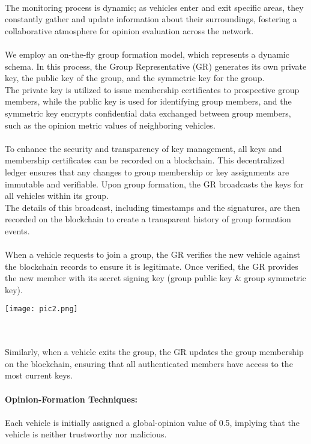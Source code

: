 \documentclass[a4paper,14pt]{extarticle}
\begin{document}
\\ 
The monitoring process is dynamic; as vehicles enter and exit specific areas, they constantly gather and update information about their surroundings, fostering a collaborative atmosphere for opinion evaluation across the network.
\\ \\ 
We employ an on-the-fly group formation model, which represents a dynamic schema. In this process, the Group Representative (GR) generates its own private key, the public key of the group, and the symmetric key for the group.
\\
The private key is utilized to issue membership certificates to prospective group members, while the public key is used for identifying group members, and the symmetric key encrypts confidential data exchanged between group members, such as the opinion metric values of neighboring vehicles.
\\ \\ 
To enhance the security and transparency of key management, all keys and membership certificates can be recorded on a blockchain. This decentralized ledger ensures that any changes to group membership or key assignments are immutable and verifiable. Upon group formation, the GR broadcasts the keys for all vehicles within its group. 
\\
The details of this broadcast, including timestamps and the signatures, are then recorded on the blockchain to create a transparent history of group formation events.
\\ \\
When a vehicle requests to join a group, the GR verifies the new vehicle against the blockchain records to ensure it is legitimate. Once verified, the GR provides the new member with its secret signing key (group public key \& group symmetric key).
\\
\begin{center}
    \texttt{[image: pic2.png]}
\end{center}
\\ \\
Similarly, when a vehicle exits the group, the GR updates the group membership on the blockchain, ensuring that all authenticated members have access to the most current keys.
\\ \\ 
\textbf{Opinion-Formation Techniques:}
\\ \\ 
Each vehicle is initially assigned a global-opinion value of 0.5, implying that the vehicle is neither trustworthy nor malicious. 
\end{document}
